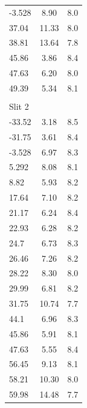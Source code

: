 \documentclass[12pt,preprint]{aastex}
\begin{document}
\begin{table}
\begin{tabular}{l c c}
       -3.528    &    8.90   &   8.0 \\
       37.04    &  11.33   &   8.0 \\
       38.81    &  13.64   &   7.8 \\
       45.86    &  3.86   &   8.4 \\
       47.63    &  6.20   &  8.0 \\
       49.39    &  5.34   &   8.1 \\
 & & \\
Slit 2 & & \\
       -33.52    &  3.18   &  8.5 \\
       -31.75    &  3.61   &  8.4 \\
       -3.528    &  6.97   &  8.3 \\
       5.292    &  8.08   &  8.1 \\
        8.82    &  5.93   &  8.2 \\
       17.64    &  7.10   &  8.2 \\
       21.17    &  6.24   &  8.4 \\
       22.93    &  6.28   &  8.2 \\
        24.7    &  6.73   &  8.3 \\
       26.46    &   7.26   &  8.2 \\
       28.22    &  8.30   &  8.0 \\
       29.99    &   6.81   &  8.2 \\
       31.75    &  10.74   &  7.7 \\
        44.1    &  6.96   &  8.3 \\
       45.86    &  5.91   &  8.1 \\
       47.63    &  5.55   &  8.4 \\
       56.45    &  9.13   &  8.1 \\
       58.21    &   10.30   & 8.0 \\
       59.98    &  14.48   &  7.7 \\
\hline                                   %
\end{tabular}
\end{table}

\clearpage
\end{document}
